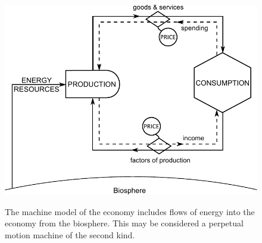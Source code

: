 \begin{figure}[H]
\centering\
\includegraphics[width=\linewidth]{Part_0/Chapter_Acct_For_WoN/images/Perpetual_motion_2.pdf}
\caption[The machine model]{The machine model of the economy includes
flows of energy into the economy from the biosphere.
This may be considered a perpetual motion machine 
of the second kind.}
\label{fig:perp_motion_2}
\end{figure}

